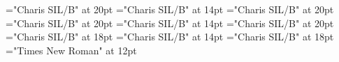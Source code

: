 \documentclass[a4paper]{article}
\begin{document}
 
\pagestyle{plain} 
\font\spannkoTitleMainNormalscrBookscrBody="Charis SIL/B" at 20pt
\font\TitleSecondarynkoTitleMainNormalscrBookscrBody="Charis SIL/B" at 14pt
\font\TitleMainNormalscrBookscrBody="Charis SIL/B" at 20pt
\font\spannkoTitleMainNonescrBookscrBody="Charis SIL/B" at 20pt
\font\TitleSecondarynkoTitleMainNonescrBookscrBody="Charis SIL/B" at 14pt
\font\TitleMainNonescrBookscrBody="Charis SIL/B" at 20pt
\font\spannkoTitleMainscrBookscrBody="Charis SIL/B" at 18pt
\font\TitleSecondarynkoTitleMainscrBookscrBody="Charis SIL/B" at 14pt
\font\TitleMainscrBookscrBody="Charis SIL/B" at 18pt
\font\scrBookscrBody="Times New Roman" at 12pt

\pagestyle{fancy} 
\begin{adjustwidth}{36pt}{0pt}{12pt}{0pt}\begin{spacing}{1}\begin{center}


\end{center}\end{spacing}\end{adjustwidth} \begin{adjustwidth}{36pt}{0pt}{12pt}{0pt}\begin{center}


\end{center}\end{adjustwidth} \begin{adjustwidth}{36pt}{0pt}{12pt}{0pt}\begin{spacing}{1.5}\begin{center}


\end{center}\end{spacing}\end{adjustwidth} 
\end{document}
